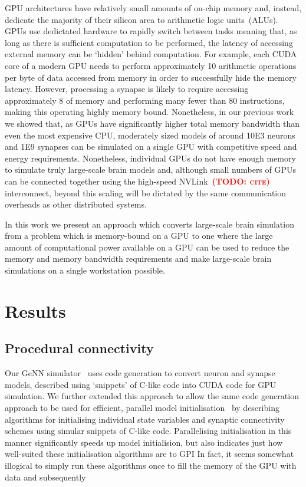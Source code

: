 \documentclass[9pt,twocolumn,twoside,lineno]{pnas-new}
\newcommand{\todo}[1]{\textbf{\textsc{\textcolor{red}{(TODO: #1)}}}}
\begin{document}
GPU architectures have relatively small amounts of on-chip memory and, instead, dedicate the majority of their silicon area to arithmetic logic units~(ALUs).
GPUs use dedictated hardware to rapidly switch between tasks meaning that, as long as there is sufficient computation to be performed, the latency of accessing external memory can be `hidden' behind computation.
For example, each CUDA core of a modern GPU needs to perform approximately 10 arithmetic operations per byte of data accessed from memory in order to successfully hide the memory latency.
However, processing a synapse is likely to require accessing approximately \SI{8}{\byte} of memory and performing many fewer than 80 instructions, making this operating highly memory bound.
Nonetheless, in our previous work~\citep{Knight2018} we showed that, as GPUs have significantly higher total memory bandwidth than even the most expensive CPU, moderately sized models of around \num{10E3} neurons and \num{1E9} synapses can be simulated on a single GPU with competitive speed and energy requirements.
Nonetheless, individual GPUs do not have enough memory to simulate truly large-scale brain models and, although small numbers of GPUs can be connected together using the high-speed NVLink~\todo{cite} interconnect, beyond this scaling will be dictated by the same communication overheads as other distributed systems.

In this work we present an approach which converts large-scale brain simulation from a problem which is memory-bound on a GPU to one where the large amount of computational power available on a GPU can be used to reduce the memory and memory bandwidth requirements and make large-scale brain simulations on a single workstation possible.

\section*{Results}
\subsection*{Procedural connectivity}
Our GeNN simulator~\citep{Yavuz2016} uses code generation to convert neuron and synapse models, described using `snippets' of C-like code into CUDA code for GPU simulation.
We further extended this approach to allow the same code generation approach to be used for efficient, parallel model initialisation~\citep{Knight2018} by describing algorithms for initialising individual state variables and synaptic connectivity schemes using simular snippets of C-like code.
Parallelising initialisation in this manner significantly speeds up model initialision, but also indicates just how well-suited these initialisation algorithms are to GPI 
In fact, it seems somewhat illogical to simply run these algorithms once to fill the memory of the GPU with data and subsequently 
\end{document}
